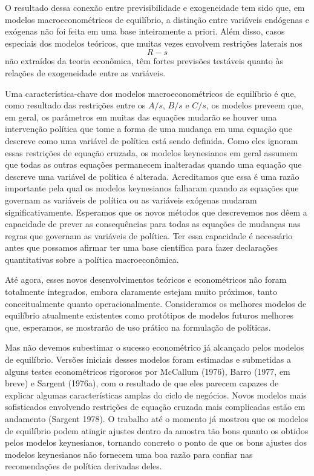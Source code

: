\documentclass[a4paper,12pt]{article}[abntex2]
\begin{document}
O resultado dessa conexão entre previsibilidade e exogeneidade tem sido que, em modelos macroeconométricos de equilíbrio, a distinção entre variáveis endógenas e exógenas não foi feita em uma base inteiramente a priori. Além disso, casos especiais dos modelos teóricos, que muitas vezes envolvem restrições laterais nos $$R-s$$ não extraídos da teoria econômica, têm fortes previsões testáveis quanto às relações de exogeneidade entre as variáveis.

Uma característica-chave dos modelos macroeconométricos de equilíbrio é que, como resultado das restrições entre os $A/s$, $B/s$ e $C/s$, os modelos preveem que, em geral, os parâmetros em muitas das equações mudarão se houver uma intervenção política que tome a forma de uma mudança em uma equação que descreve como uma variável de política está sendo definida. Como eles ignoram essas restrições de equação cruzada, os modelos keynesianos em geral assumem que todas as outras equações permanecem inalteradas quando uma equação que descreve uma variável de política é alterada. Acreditamos que essa é uma razão importante pela qual os modelos keynesianos falharam quando as equações que governam as variáveis de política ou as variáveis exógenas mudaram significativamente. Esperamos que os novos métodos que descrevemos nos dêem a capacidade de prever as consequências para todas as equações de mudanças nas regras que governam as variáveis de política. Ter essa capacidade é necessário antes que possamos afirmar ter uma base científica para fazer declarações quantitativas sobre a política macroeconômica.

Até agora, esses novos desenvolvimentos teóricos e econométricos não foram totalmente integrados, embora claramente estejam muito próximos, tanto conceitualmente quanto operacionalmente. Consideramos os melhores modelos de equilíbrio atualmente existentes como protótipos de modelos futuros melhores que, esperamos, se mostrarão de uso prático na formulação de políticas.

Mas não devemos subestimar o sucesso econométrico já alcançado pelos modelos de equilíbrio. Versões iniciais desses modelos foram estimadas e submetidas a alguns testes econométricos rigorosos por McCallum (1976), Barro (1977, em breve) e Sargent (1976a), com o resultado de que eles parecem capazes de explicar algumas características amplas do ciclo de negócios. Novos modelos mais sofisticados envolvendo restrições de equação cruzada mais complicadas estão em andamento (Sargent 1978). O trabalho até o momento já mostrou que os modelos de equilíbrio podem atingir ajustes dentro da amostra tão bons quanto os obtidos pelos modelos keynesianos, tornando concreto o ponto de que os bons ajustes dos modelos keynesianos não fornecem uma boa razão para confiar nas recomendações de política derivadas deles.
\end{document}
